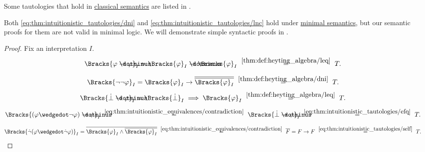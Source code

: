\begin{comments}
  \item Some tautologies that hold in \hyperref[def:propositional_semantics]{classical semantics} are listed in .
  \item Both \eqref{eq:thm:intuitionistic_tautologies/dni} and \eqref{eq:thm:intuitionistic_tautologies/lnc} hold under \hyperref[def:minimal_propositional_semantics]{minimal semantics}, but our semantic proofs for them are not valid in minimal logic. We will demonstrate simple syntactic proofs in .
\end{comments}
\begin{proof}
  Fix an interpretation \( I \).

  \begin{equation*}
    \Bracks{\varphi \synimplies \varphi}_I
    =
    \Bracks{\varphi}_I \synimplies \Bracks{\varphi}_I
    \reloset {\ref{thm:def:heyting_algebra/leq}} =
    T.
  \end{equation*}

  \begin{equation*}
    \Bracks{\neg \neg \varphi}_I
    =
    \Bracks{\varphi}_I \rightarrow \oline{\oline{\Bracks{\varphi}_I}}
    \reloset {\ref{thm:def:heyting_algebra/dni}} =
    T.
  \end{equation*}

  \begin{equation*}
    \Bracks{\synbot \synimplies \varphi}_I
    =
    \Bracks{\synbot}_I \implies \Bracks{\varphi}_I
    \reloset {\ref{thm:def:heyting_algebra/leq}} =
    T.
  \end{equation*}

  \begin{equation*}
    \Bracks{(\varphi \synwedge \neg \varphi) \synimplies \psi}_I
    \reloset {\eqref{eq:thm:intuitionistic_equivalences/contradiction}} =
    \Bracks{\synbot \synimplies \psi}_I
    \reloset {\eqref{eq:thm:intuitionistic_tautologies/efq}} =
    T.
  \end{equation*}

  \begin{equation*}
    \Bracks{\synneg (\varphi \synwedge \synneg \varphi)}_I
    =
    \oline{\Bracks{\varphi}_I \wedge \oline{\Bracks{\varphi}_I}}
    \reloset {\eqref{eq:thm:intuitionistic_equivalences/contradiction}} =
    \oline{F}
    =
    F \rightarrow F
    \reloset {\eqref{eq:thm:intuitionistic_tautologies/self}} =
    T.
  \end{equation*}
\end{proof}


